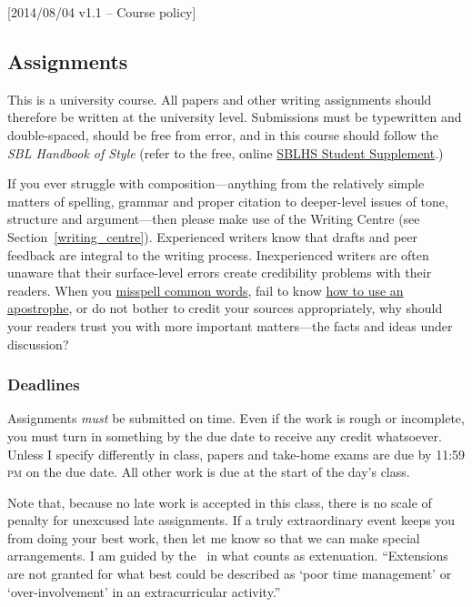 [2014/08/04 v1.1 -- Course policy]

\subsection{Assignments}
\label{assignments}

This is a university course. All papers and other writing assignments
should therefore be written at the university level. Submissions must be
typewritten and double-spaced, should be free from error, and in this course
should follow the \emph{SBL Handbook of Style} (refer to the free, online
\href{http://www.sbl-site.org/assets/pdfs/sblhs_ss92804_revised_ed.pdf}{SBLHS
Student Supplement}.)

If you ever struggle with composition---anything from the relatively simple
matters of spelling, grammar and proper citation to deeper-level issues of
tone, structure and argument---then please make use of the Writing Centre (see
Section~\ref{writing_centre}). Experienced writers know that drafts and peer
feedback are integral to the writing process. Inexperienced writers are often
unaware that their surface-level errors create credibility problems with their
readers. When you \href{http://theoatmeal.com/comics/misspelling}{misspell
common words}, fail to know \href{http://theoatmeal.com/comics/apostrophe}{how
to use an apostrophe}, or do not bother to credit your sources appropriately,
why should your readers trust you with more important matters---the facts and
ideas under discussion?

\subsubsection{Deadlines}
\label{deadlines}

Assignments \emph{must} be submitted on time. Even if the work is rough or
incomplete, you must turn in something by the due date to receive any credit
whatsoever. Unless I specify differently in class, papers and take-home exams
are due by 11:59 \textsc{pm} on the due date. All other work is due at the
start of the day's class.

Note that, because no late work is accepted in this class, there is no scale
of penalty for unexcused late assignments. If a truly extraordinary event
keeps you from doing your best work, then let me know so that we can make
special arrangements. I am guided by the \AC\ in what counts as extenuation.
``Extensions are not granted for what best could be described as `poor time
management' or `over-involvement' in an extracurricular activity.''

